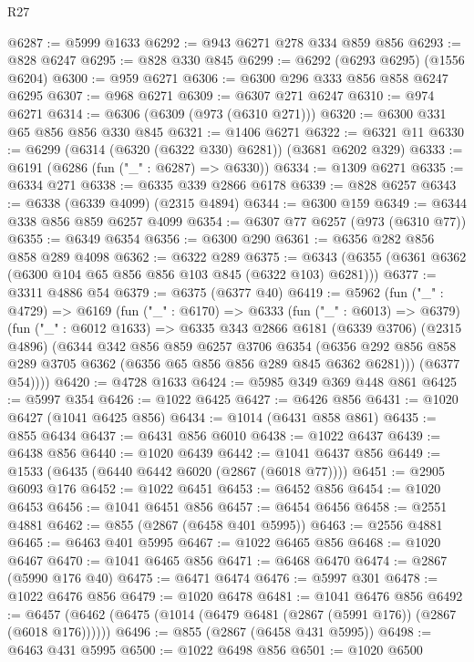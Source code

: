 \begin{lexlean}{R27}
\begin{coremodule}
@6287 := @5999 @1633
@6292 := @943 @6271 @278 @334 @859 @856
@6293 := @828 @6247
@6295 := @828 @330 @845
@6299 := @6292 (@6293 @6295) (@1556 @6204)
@6300 := @959 @6271
@6306 := @6300 @296 @333 @856 @858 @6247 @6295
@6307 := @968 @6271
@6309 := @6307 @271 @6247
@6310 := @974 @6271
@6314 := @6306 (@6309 (@973 (@6310 @271)))
@6320 := @6300 @331 @65 @856 @856 @330 @845
@6321 := @1406 @6271
@6322 := @6321 @11
@6330 := @6299 (@6314 (@6320 (@6322 @330) @6281)) (@3681 @6202 @329)
@6333 := @6191 (@6286 (fun ("_" : @6287) => @6330))
@6334 := @1309 @6271
@6335 := @6334 @271
@6338 := @6335 @339 @2866 @6178
@6339 := @828 @6257
@6343 := @6338 (@6339 @4099) (@2315 @4894)
@6344 := @6300 @159
@6349 := @6344 @338 @856 @859 @6257 @4099
@6354 := @6307 @77 @6257 (@973 (@6310 @77))
@6355 := @6349 @6354
@6356 := @6300 @290
@6361 := @6356 @282 @856 @858 @289 @4098
@6362 := @6322 @289
@6375 := @6343 (@6355 (@6361 @6362 (@6300 @104 @65 @856 @856 @103 @845 (@6322 @103) @6281)))
@6377 := @3311 @4886 @54
@6379 := @6375 (@6377 @40)
@6419 := @5962
    (fun ("_" : @4729) =>
    @6169
      (fun ("_" : @6170) =>
      @6333
        (fun ("_" : @6013) => @6379)
        (fun ("_" : @6012 @1633) =>
        @6335
          @343
          @2866
          @6181
          (@6339 @3706)
          (@2315 @4896)
          (@6344
            @342
            @856
            @859
            @6257
            @3706
            @6354
            (@6356 @292 @856 @858 @289 @3705 @6362 (@6356 @65 @856 @856 @289 @845 @6362 @6281)))
          (@6377 @54))))
@6420 := @4728 @1633
@6424 := @5985 @349 @369 @448 @861
@6425 := @5997 @354
@6426 := @1022 @6425
@6427 := @6426 @856
@6431 := @1020 @6427 (@1041 @6425 @856)
@6434 := @1014 (@6431 @858 @861)
@6435 := @855 @6434
@6437 := @6431 @856 @6010
@6438 := @1022 @6437
@6439 := @6438 @856
@6440 := @1020 @6439
@6442 := @1041 @6437 @856
@6449 := @1533 (@6435 (@6440 @6442 @6020 (@2867 (@6018 @77))))
@6451 := @2905 @6093 @176
@6452 := @1022 @6451
@6453 := @6452 @856
@6454 := @1020 @6453
@6456 := @1041 @6451 @856
@6457 := @6454 @6456
@6458 := @2551 @4881
@6462 := @855 (@2867 (@6458 @401 @5995))
@6463 := @2556 @4881
@6465 := @6463 @401 @5995
@6467 := @1022 @6465 @856
@6468 := @1020 @6467
@6470 := @1041 @6465 @856
@6471 := @6468 @6470
@6474 := @2867 (@5990 @176 @40)
@6475 := @6471 @6474
@6476 := @5997 @301
@6478 := @1022 @6476 @856
@6479 := @1020 @6478
@6481 := @1041 @6476 @856
@6492 := @6457 (@6462 (@6475 (@1014 (@6479 @6481 (@2867 (@5991 @176)) (@2867 (@6018 @176))))))
@6496 := @855 (@2867 (@6458 @431 @5995))
@6498 := @6463 @431 @5995
@6500 := @1022 @6498 @856
@6501 := @1020 @6500

\end{coremodule}
\end{lexlean}
